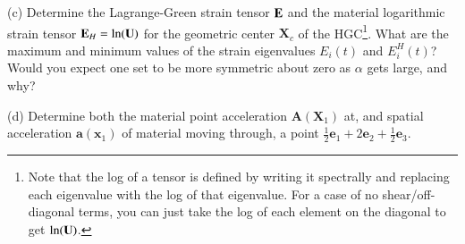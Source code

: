 \medskip
(c) Determine the Lagrange-Green strain tensor $\mathbf{E}$ and the material logarithmic strain tensor $\mathbf{E}_H = \ln (\mathbf{U})$ for the geometric center $\bm{X}_c$ of the HGC\footnote{Note that the log of a tensor is defined by writing it spectrally and replacing each eigenvalue with the log of that eigenvalue. For a case of no shear/off-diagonal terms, you can just take the log of each element on the diagonal to get $\ln(\mathbf{U})$.}. 
What are the maximum and minimum values of the strain eigenvalues $E_i(t)$ and $E_i^H(t)$? 
Would you expect one set to be more symmetric about zero as $\alpha$ gets large, and why?

\medskip
(d) Determine both the material point acceleration $\bm{A}(\bm{X}_1)$ at, and spatial acceleration $\bm{a}(\bm{x}_1)$ of material moving through, a point $\frac{1}{2} \bm{e}_1 + 2\bm{e}_2 + \frac{1}{2} \bm{e}_3$.  

\begin{figure}
\centering
{}
\end{figure}

